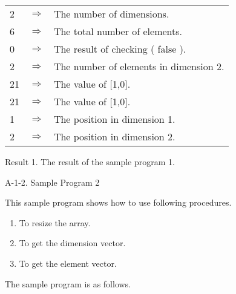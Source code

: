 \begin{center}
\begin{tabular}{|lll|}\hline
2  & $\Longrightarrow$  & The number of dimensions.\\
6  & $\Longrightarrow$  & The total number of elements.\\
0  & $\Longrightarrow$  & The result of checking ( false ).\\
2  & $\Longrightarrow$  & The number of elements in dimension 2.\\
21 & $\Longrightarrow$  & The value of [1,0].\\
21 & $\Longrightarrow$  & The value of [1,0].\\
1  & $\Longrightarrow$  & The position in dimension 1.\\
2  & $\Longrightarrow$  & The position in dimension 2.\\\hline
\end{tabular}
\vspace*{5mm}

Result 1. The result of the sample program 1.
\end{center}

\vspace*{20mm}

\noindent
{\Large A-1-2. Sample Program 2}

\vspace*{7mm}

\noindent
This sample program shows how to use following procedures.

\begin{enumerate}
\item To resize the array.
\item To get the dimension vector.
\item To get the element vector.
\end{enumerate}

\vspace*{5mm}

\noindent
The sample program is as follows.

\clearpage

